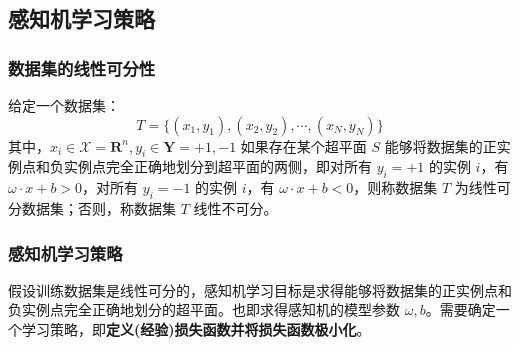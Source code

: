 \subsection{感知机学习策略}
\subsubsection{数据集的线性可分性}

\begin{definition}[数据集的线性可分性]
    给定一个数据集：
    \[T = \{ (x_1,y_1),(x_2,y_2),\cdots,(x_N,y_N) \}\]
    其中，$x_i \in \mathcal{X} = \mathbf{R}^n, y_i \in \mathbf{Y} = {+1,-1}$ 如果存在某个超平面 $S$ 能够将数据集的正实例点和负实例点完全正确地划分到超平面的两侧，即对所有 $y_i = +1$ 的实例 $i$，有 $\omega \cdot x + b>0$，对所有 $y_i = -1$ 的实例 $i$，有 $\omega \cdot x + b<0$，则称数据集 $T$ 为线性可分数据集；否则，称数据集 $T$ 线性不可分。
\end{definition}

\subsubsection{感知机学习策略}
假设训练数据集是线性可分的，感知机学习目标是求得能够将数据集的正实例点和负实例点完全正确地划分的超平面。也即求得感知机的模型参数 $\omega,b$。需要确定一个学习策略，即\textbf{定义(经验)损失函数并将损失函数极小化}。












\newpage